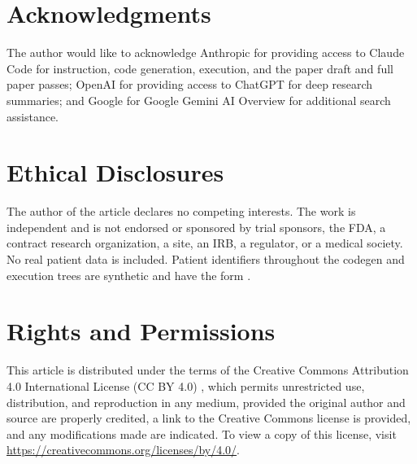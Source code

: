 %
%

{}
\section*{Acknowledgments}

The author would like to acknowledge Anthropic for providing access
to Claude Code for instruction, code generation, execution, and the
paper draft and full paper passes; OpenAI for providing access to
ChatGPT for deep research summaries; and Google for Google Gemini AI
Overview for additional search assistance.

{}
\section*{Ethical Disclosures}

The author of the article declares no competing interests. The work
is independent and is not endorsed or sponsored by trial sponsors,
the FDA, a contract research organization, a site, an IRB, a
regulator, or a medical society. No real patient data is included.
Patient identifiers throughout the codegen and execution trees are
synthetic and have the form .

{}
\section*{Rights and Permissions}

This article is distributed under the terms of the Creative Commons
Attribution 4.0 International License (CC BY 4.0)
\cite{ccby40}, which permits unrestricted use, distribution, and
reproduction in any medium, provided the original author and source
are properly credited, a link to the Creative Commons license is
provided, and any modifications made are indicated. To view a copy
of this license, visit
\href{https://creativecommons.org/licenses/by/4.0/}{https://creativecommons.org/licenses/by/4.0/}.

